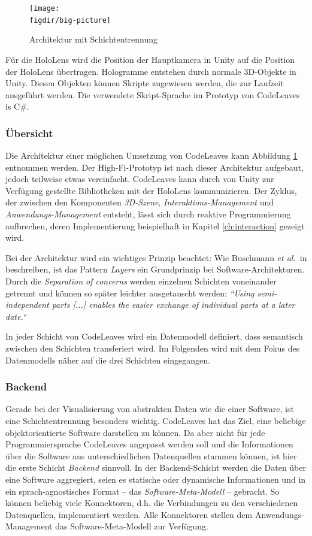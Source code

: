 \begin{figure}[htb]
  \texttt{[image: \\figdir/big-picture]}
  \caption{Architektur mit Schichtentrennung}
  \label{fig:architecture}
\end{figure}

Für die HoloLens wird die Position der Hauptkamera in Unity auf die Position der HoloLens übertragen. Hologramme entstehen durch normale 3D-Objekte in Unity. Diesen Objekten können Skripte zugewiesen werden, die zur Laufzeit ausgeführt werden. Die verwendete Skript-Sprache im Prototyp von CodeLeaves is C\#.

\subsubsection*{Übersicht}

Die Architektur einer möglichen Umsetzung von CodeLeaves kann Abbildung \ref{fig:architecture} entnommen werden. Der High-Fi-Prototyp ist nach dieser Architektur aufgebaut, jedoch teilweise etwas vereinfacht. CodeLeaves kann durch von Unity zur Verfügung gestellte Bibliotheken mit der HoloLens kommunizieren. Der Zyklus, der zwischen den Komponenten \textit{3D-Szene}, \textit{Interaktions-Management} und \textit{Anwendungs-Management} entsteht, lässt sich durch reaktive Programmierung aufbrechen, deren Implementierung beispielhaft in Kapitel \ref{ch:interaction} gezeigt wird.

Bei der Architektur wird ein wichtiges Prinzip beachtet: Wie Buschmann \textit{et al.}\ in \cite{frank2007pattern} beschreiben, ist das Pattern \textit{Layers} ein Grundprinzip bei Software-Architekturen. Durch die \textit{Separation of concerns} werden einzelnen Schichten voneinander getrennt und können so später leichter ausgetauscht werden: \textit{``Using semi-independent parts [...] enables the easier exchange of individual parts at a later date.``} \cite{frank2007pattern}

In jeder Schicht von CodeLeaves wird ein Datenmodell definiert, dass semantisch zwischen den Schichten transferiert wird. Im Folgenden wird mit dem Fokus des Datenmodells näher auf die drei Schichten eingegangen.

\subsubsection*{Backend}
Gerade bei der Visualisierung von abstrakten Daten wie die einer Software, ist eine Schichtentrennung besonders wichtig. CodeLeaves hat das Ziel, eine beliebige objektorientierte Software darstellen zu können. Da aber nicht für jede Programmiersprache CodeLeaves angepasst werden soll und die Informationen über die Software aus unterschiedlichen Datenquellen stammen können, ist hier die erste Schicht \textit{Backend} sinnvoll. In der Backend-Schicht werden die Daten über eine Software aggregiert, seien es statische oder dynamische Informationen und in ein sprach-agnostisches Format -- das \textit{Software-Meta-Modell} -- gebracht. So können beliebig viele Konnektoren, d.h. die Verbindungen zu den verschiedenen Datenquellen, implementiert werden. Alle Konnektoren stellen dem Anwendungs-Management das Software-Meta-Modell zur Verfügung.

